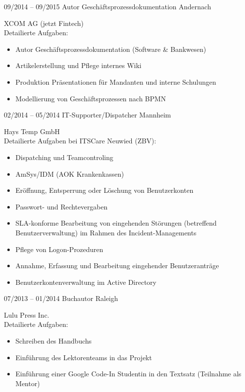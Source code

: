\documentclass[a4paper]{friggeri-cv} %
\begin{document}
\begin{entrylist}
\entry
{09/2014 -- 09/2015}
{Autor Geschäftsprozessdokumentation}
{Andernach}
{XCOM AG (jetzt Fintech) \\
	Detailierte Aufgaben:
	\begin{itemize}
		\item Autor Geschäftsprozessdokumentation (Software \& Bankwesen)
		\item Artikelerstellung und Pflege internes Wiki
		\item Produktion Präsentationen für Mandanten und interne Schulungen
		\item Modellierung von Geschäftsprozessen nach BPMN
	\end{itemize}
}
\entry
{02/2014 -- 05/2014}
{IT-Supporter/Dispatcher}
{Mannheim}
{Hays Temp GmbH \\
    Detailierte Aufgaben bei ITSCare Neuwied (ZBV):
    \begin{itemize}
        \item Dispatching und Teamcontroling
        \item AmSys/IDM (AOK Krankenkassen)
        \item Eröffnung, Entsperrung oder Löschung von Benutzerkonten
        \item Passwort- und Rechtevergaben
        \item SLA-konforme Bearbeitung von eingehenden Störungen (betreffend Benutzerverwaltung) im Rahmen des Incident-Managements
        \item Pflege von Logon-Prozeduren
        \item Annahme, Erfassung und Bearbeitung eingehender Benutzeranträge
        \item Benutzerkontenverwaltung im Active Directory
    \end{itemize}
}
\entry
{07/2013 -- 01/2014}
{Buchautor}
{Raleigh}
{Lulu Press Inc.\\
    Detailierte Aufgaben:
    \begin{itemize}
        \item Schreiben des Handbuchs
        \item Einführung des Lektorenteams in das Projekt
        \item Einführung einer Google Code-In Studentin in den Textsatz (Teilnahme als Mentor)
    \end{itemize}
}
\end{entrylist}
\end{document}

